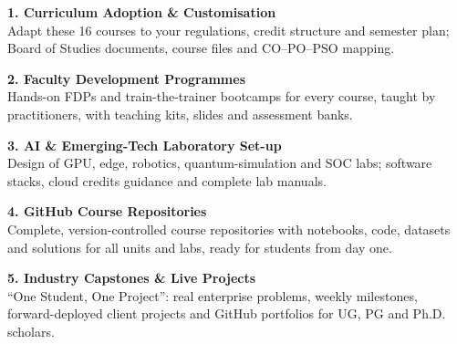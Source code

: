 \documentclass[10pt,a4paper]{article}
\begin{document}
\begin{tcbraster}[raster columns=2,raster equal height=rows,raster column skip=8pt,raster row skip=6pt]
\begin{tcolorbox}[colback=white,colframe=saffron!60,boxrule=0.6pt,arc=2pt,left=5pt,right=5pt,top=3pt,bottom=3pt,borderline north={2.5pt}{0pt}{saffron}]{\small\bfseries\color{navy}1. Curriculum Adoption \& Customisation}\\[1pt]{\footnotesize Adapt these 16 courses to your regulations, credit structure and semester plan; Board of Studies documents, course files and CO--PO--PSO mapping.}\end{tcolorbox}
\begin{tcolorbox}[colback=white,colframe=chakra!60,boxrule=0.6pt,arc=2pt,left=5pt,right=5pt,top=3pt,bottom=3pt,borderline north={2.5pt}{0pt}{chakra}]{\small\bfseries\color{navy}2. Faculty Development Programmes}\\[1pt]{\footnotesize Hands-on FDPs and train-the-trainer bootcamps for every course, taught by practitioners, with teaching kits, slides and assessment banks.}\end{tcolorbox}
\begin{tcolorbox}[colback=white,colframe=igreen!60,boxrule=0.6pt,arc=2pt,left=5pt,right=5pt,top=3pt,bottom=3pt,borderline north={2.5pt}{0pt}{igreen}]{\small\bfseries\color{navy}3. AI \& Emerging-Tech Laboratory Set-up}\\[1pt]{\footnotesize Design of GPU, edge, robotics, quantum-simulation and SOC labs; software stacks, cloud credits guidance and complete lab manuals.}\end{tcolorbox}
\begin{tcolorbox}[colback=white,colframe=saffron!60,boxrule=0.6pt,arc=2pt,left=5pt,right=5pt,top=3pt,bottom=3pt,borderline north={2.5pt}{0pt}{saffron}]{\small\bfseries\color{navy}4. GitHub Course Repositories}\\[1pt]{\footnotesize Complete, version-controlled course repositories with notebooks, code, datasets and solutions for all units and labs, ready for students from day one.}\end{tcolorbox}
\begin{tcolorbox}[colback=white,colframe=chakra!60,boxrule=0.6pt,arc=2pt,left=5pt,right=5pt,top=3pt,bottom=3pt,borderline north={2.5pt}{0pt}{chakra}]{\small\bfseries\color{navy}5. Industry Capstones \& Live Projects}\\[1pt]{\footnotesize ``One Student, One Project'': real enterprise problems, weekly milestones, forward-deployed client projects and GitHub portfolios for UG, PG and Ph.D. scholars.}\end{tcolorbox}

\end{tcbraster}
\end{document}
